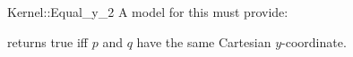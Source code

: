 \begin{ccRefFunctionObjectConcept}{Kernel::Equal_y_2}
A model for this must provide:


{returns true iff $p$ and $q$ have the same Cartesian $y$-coordinate.}

\ccIsModel{}

\end{ccRefFunctionObjectConcept}
